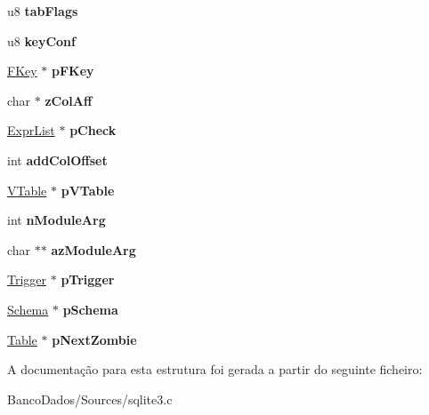 \begin{DoxyCompactItemize}
\item 
\hypertarget{struct_table_ab0aeb112ae7e1b81e2a18bc493f7992c}{u8 {\bfseries tab\-Flags}}\label{struct_table_ab0aeb112ae7e1b81e2a18bc493f7992c}

\item 
\hypertarget{struct_table_add1b22425db781d976d25b4465a2965a}{u8 {\bfseries key\-Conf}}\label{struct_table_add1b22425db781d976d25b4465a2965a}

\item 
\hypertarget{struct_table_a37ccce5ee6d530001d49c82788c6616d}{\hyperlink{struct_f_key}{F\-Key} $\ast$ {\bfseries p\-F\-Key}}\label{struct_table_a37ccce5ee6d530001d49c82788c6616d}

\item 
\hypertarget{struct_table_ac95c0c7b04f2c8367beb98d386d4228f}{char $\ast$ {\bfseries z\-Col\-Aff}}\label{struct_table_ac95c0c7b04f2c8367beb98d386d4228f}

\item 
\hypertarget{struct_table_a4513ad39c4adad36fdf5dd3c6cb70a12}{\hyperlink{struct_expr_list}{Expr\-List} $\ast$ {\bfseries p\-Check}}\label{struct_table_a4513ad39c4adad36fdf5dd3c6cb70a12}

\item 
\hypertarget{struct_table_ab6f1ad10bce5c20faca55cd0a9c3f1ff}{int {\bfseries add\-Col\-Offset}}\label{struct_table_ab6f1ad10bce5c20faca55cd0a9c3f1ff}

\item 
\hypertarget{struct_table_a7b9903cfbfefe7b8bf872c4f50cb2e95}{\hyperlink{struct_v_table}{V\-Table} $\ast$ {\bfseries p\-V\-Table}}\label{struct_table_a7b9903cfbfefe7b8bf872c4f50cb2e95}

\item 
\hypertarget{struct_table_a74a2c5547ea876ebe77dbea0d99361bf}{int {\bfseries n\-Module\-Arg}}\label{struct_table_a74a2c5547ea876ebe77dbea0d99361bf}

\item 
\hypertarget{struct_table_af3af6596efa41894bcd3c3c9f9b6781f}{char $\ast$$\ast$ {\bfseries az\-Module\-Arg}}\label{struct_table_af3af6596efa41894bcd3c3c9f9b6781f}

\item 
\hypertarget{struct_table_aca61c40bb0164f2c6fc3406c28988660}{\hyperlink{struct_trigger}{Trigger} $\ast$ {\bfseries p\-Trigger}}\label{struct_table_aca61c40bb0164f2c6fc3406c28988660}

\item 
\hypertarget{struct_table_a1d6ce038a061722cebaeba0f3ffceacf}{\hyperlink{struct_schema}{Schema} $\ast$ {\bfseries p\-Schema}}\label{struct_table_a1d6ce038a061722cebaeba0f3ffceacf}

\item 
\hypertarget{struct_table_ae365eb0d8f6d3cb39f3908323cba45e4}{\hyperlink{struct_table}{Table} $\ast$ {\bfseries p\-Next\-Zombie}}\label{struct_table_ae365eb0d8f6d3cb39f3908323cba45e4}

\end{DoxyCompactItemize}


A documentação para esta estrutura foi gerada a partir do seguinte ficheiro\-:\begin{DoxyCompactItemize}
\item 
Banco\-Dados/\-Sources/sqlite3.\-c\end{DoxyCompactItemize}
